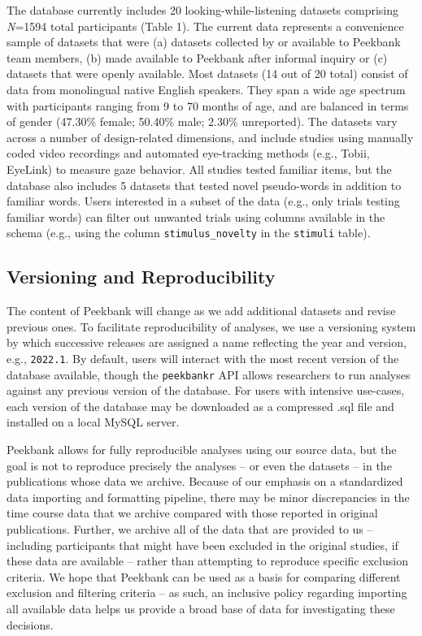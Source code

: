 \documentclass[
  english,
  man,floatsintext]{apa6}
\begin{document}
The database currently includes 20 looking-while-listening datasets comprising \emph{N}=1594 total participants (Table 1).
The current data represents a convenience sample of datasets that were (a) datasets collected by or available to Peekbank team members, (b) made available to Peekbank after informal inquiry or (c) datasets that were openly available.
Most datasets (14 out of 20 total) consist of data from monolingual native English speakers.
They span a wide age spectrum with participants ranging from 9 to 70 months of age, and are balanced in terms of gender (47.30\% female; 50.40\% male; 2.30\% unreported).
The datasets vary across a number of design-related dimensions, and include studies using manually coded video recordings and automated eye-tracking methods (e.g., Tobii, EyeLink) to measure gaze behavior.
All studies tested familiar items, but the database also includes 5 datasets that tested novel pseudo-words in addition to familiar words.
Users interested in a subset of the data (e.g., only trials testing familiar words) can filter out unwanted trials using columns available in the schema (e.g., using the column \texttt{stimulus\_novelty} in the \texttt{stimuli} table).

\hypertarget{versioning-and-reproducibility}{%
\subsection{Versioning and Reproducibility}\label{versioning-and-reproducibility}}

The content of Peekbank will change as we add additional datasets and revise previous ones.
To facilitate reproducibility of analyses, we use a versioning system by which successive releases are assigned a name reflecting the year and version, e.g., \texttt{2022.1}.
By default, users will interact with the most recent version of the database available, though the \texttt{peekbankr} API allows researchers to run analyses against any previous version of the database.
For users with intensive use-cases, each version of the database may be downloaded as a compressed .sql file and installed on a local MySQL server.

Peekbank allows for fully reproducible analyses using our source data, but the goal is not to reproduce precisely the analyses -- or even the datasets -- in the publications whose data we archive. Because of our emphasis on a standardized data importing and formatting pipeline, there may be minor discrepancies in the time course data that we archive compared with those reported in original publications. Further, we archive all of the data that are provided to us -- including participants that might have been excluded in the original studies, if these data are available -- rather than attempting to reproduce specific exclusion criteria. We hope that Peekbank can be used as a basis for comparing different exclusion and filtering criteria -- as such, an inclusive policy regarding importing all available data helps us provide a broad base of data for investigating these decisions.
\end{document}
